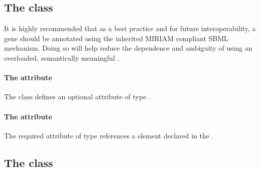 \subsection{The \FBC {} class}
\label{geneproductref-class}


It is highly recommended that as a best practice and for future interoperability, a gene should be annotated using the inherited MIRIAM compliant SBML \Annotation mechanism. Doing so will help reduce the dependence and ambiguity of using an overloaded, semantically meaningful .

\paragraph{The  attribute}
The \GeneProteinAssociation class defines an optional attribute  of type .


\paragraph{The  attribute}
The required  attribute of type  references
a \GeneProduct element declared in the \ListOfGeneProducts.
\pagebreak
\subsection{The \FBC {} class}
\label{and-class}

